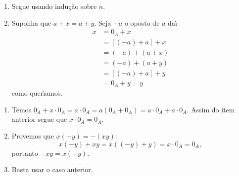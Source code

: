 \documentclass{beamer}
\begin{document}
    \begin{frame}
            \begin{enumerate}[label={\roman*})]
                \conti

                \item Segue usando indu\c{c}\~ao sobre $n$.

                \vspace{.5cm}

                \item Suponha que $a + x = a + y$. Seja $-a$ o oposto de $a$ da{\'\i}
                \begin{align*}
                    x &= 0_A + x \\ &= [(-a) + a] + x\\ &= (-a) + (a + x) \\ &= (-a) + (a + y) \\ &= [(-a) + a] + y \\ &= 0_A + y = y
                \end{align*}
                como quer{\'\i}amos.
                \seti
            \end{enumerate}
    \end{frame}

    \begin{frame}
            \begin{enumerate}[label={\roman*})]
                \conti
                \item Temos $0_A + x\cdot 0_A = a\cdot 0_A = a(0_A + 0_A) = a\cdot 0_A + a\cdot 0_A$. Assim do item anterior segue que $x\cdot 0_A = 0_A$.

                \vspace{.5cm}

                \item Provemos que $x(-y) = -(xy)$:
                \[
                    x(-y) + xy = x((-y) + y) = x\cdot 0_A = 0_A,
                \]
                portanto $-xy = x(-y)$.

                \vspace{.5cm}
                
                \item Basta usar o caso anterior.
            \end{enumerate}
    \end{frame}
\end{document}
